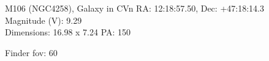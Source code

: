 \begin{block}{M106 (NGC4258), Galaxy in CVn}
    RA: 12:18:57.50, Dec: +47:18:14.3 \\ 
    Magnitude (V): 9.29 \\ 
    Dimensions: 16.98 x 7.24 PA: 150 

    Finder fov: 60 
\end{block}
